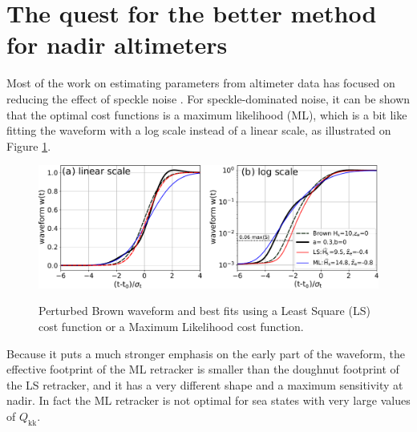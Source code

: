 \section{The quest for the better method for nadir altimeters}
Most of the work on estimating parameters from altimeter data has focused on reducing the effect of speckle noise \citep{Challenor&Srokosz1989}. For speckle-dominated noise, it can be shown that the optimal cost functions is a  maximum likelihood (ML), which is a bit like fitting the waveform with a log scale instead of a linear scale, as illustrated on Figure \ref{fig:alti_linlog}.
\begin{figure}[h!]
\centerline{\includegraphics[width=\textwidth]{FIGS_CH_SAT/waveforms_lin_log.pdf}}
  \caption{Perturbed Brown waveform and best fits using a Least Square (LS) cost function or a Maximum Likelihood cost function.}{} \label{fig:alti_linlog}
\end{figure}
Because it puts a much stronger emphasis on the early part of the waveform, the effective footprint of the ML retracker is smaller than the doughnut footprint of the LS retracker, and it has a very different shape and a maximum sensitivity at nadir.  In fact the ML retracker is not optimal for sea states with very large values of $Q_{\mathrm{kk}}$.


